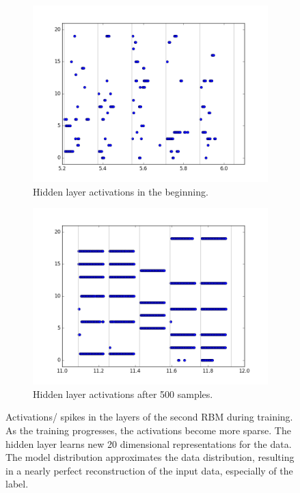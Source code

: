 \begin{figure}[h!]
	\begin{subfigure}[t]{.32\textwidth}
  		\centering
  		\includegraphics[width=.9\linewidth]{imgs/7x7/20076_h.png}
  		\caption{Hidden layer activations in the beginning.}
  		\label{fig:sub2}
	\end{subfigure}
	\begin{subfigure}[t]{.32\textwidth}
  		\centering
  		\includegraphics[width=.9\linewidth]{imgs/7x7/20946_h.png}
  		\caption{Hidden layer  activations after 500 samples.}
  		\label{fig:sub2}
	\end{subfigure}
	\caption{Activations/ spikes in the layers of the second RBM during training. As the training progresses, the activations become more sparse. The hidden layer learns new 20 dimensional representations for the data. The model distribution approximates the data distribution, resulting in a nearly perfect reconstruction of the input data, especially of the label.}
	\label{fig:stripes}
\end{figure}

